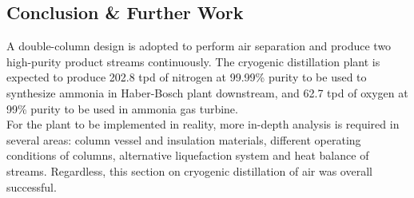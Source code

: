 \documentclass[11pt,oneside]{article}
\begin{document}
\subsection{Conclusion \& Further Work}
\noindent A double-column design is adopted to perform air separation and produce two high-purity product streams continuously. The cryogenic distillation plant is expected to produce 202.8 tpd of nitrogen at 99.99\% purity to be used to synthesize ammonia in Haber-Bosch plant downstream, and 62.7 tpd of oxygen at 99\% purity to be used in ammonia gas turbine. \\
For the plant to be implemented in reality, more in-depth analysis is required in several areas: column vessel and insulation materials, different operating conditions of columns, alternative liquefaction system and heat balance of streams. Regardless, this section on cryogenic distillation of air was overall successful.
\end{document}
